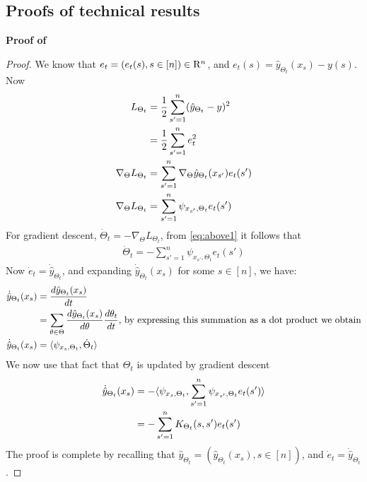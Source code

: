 \begin{appendix}
\section{Proofs of technical results}
\textbf{Proof of }
\begin{proof}
We know that $e_t=(e_t(s),s\in[n])\in\mathrm{R}^n$, and $e_t(s)=\hat{y}_{\Theta_t}(x_s)-y(s)$. Now
\begin{align} 
L_{\Theta_t}&=\frac{1}2\sum_{s'=1}^n(\hat{y}_{\Theta_t}-y)^2\nonumber\\
&=\frac{1}2\sum_{s'=1}^n e_t^2\nonumber\\
\nabla_{\Theta} L_{\Theta_t}&= \sum_{s'=1}^n\nabla_{\Theta} \hat{y}_{\Theta_t}(x_{s'})e_t(s')\nonumber\\
\label{eq:above1} \nabla_{\Theta} L_{\Theta_t}&= \sum_{s'=1}^n \psi_{x_{s'},\Theta_t}e_t(s')
\end{align}
For gradient descent, $\dot{\Theta}_t=-\nabla_{\Theta} L_{\Theta_t}$, from \eqref{eq:above1} it follows that 
\begin{align}
\dot{\Theta}_t=-\sum_{s'=1}^n \psi_{x_{s'},\Theta_t}e_t(s')
\end{align}
Now $\dot{e}_t=\dot{\hat{y}}_{\Theta_t}$, and expanding $\dot{\hat{y}}_{\Theta_t}(x_s)$ for some $s\in[n]$, we have:
\begin{align}
\dot{\hat{y}}_{\Theta_t}(x_s)&=\frac{d \hat{y}_{\Theta_t}(x_s)}{d t}\nonumber\\
&=\sum_{\theta\in\Theta}\frac{d \hat{y}_{\Theta_t}(x_s)}{d \theta}\frac{d \theta_t}{dt},\,\text{by expressing this summation as a dot product we obtain} \nonumber\\
\dot{\hat{y}}_{\Theta_t}(x_s)&=\langle \psi_{x_s,\Theta_t},\dot{\Theta}_t\rangle
\end{align}
We now use that fact that $\Theta_t$ is updated by gradient descent
\begin{align}
\dot{\hat{y}}_{\Theta_t}(x_s)&=-\langle \psi_{x_s,\Theta_t},\sum_{s'=1}^n \psi_{x_{s'},\Theta_t}e_t(s')\rangle\nonumber\\
&=-\sum_{s'=1}^n K_{\Theta_t}(s,s')e_t(s')
\end{align}
The proof is complete by recalling that $\hat{y}_{\Theta_t}=(\hat{y}_{\Theta_t}(x_s),s\in[n])$, and $\dot{e}_t=\dot{\hat{y}}_{\Theta_t}$.
\end{proof}



\end{appendix}
